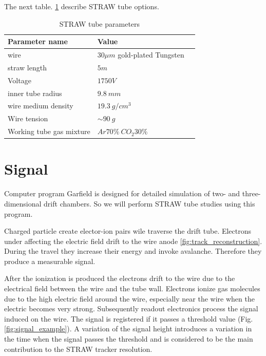 \documentclass[]{article}
\begin{document}
		The next table. \ref{table:straw_par} describe STRAW tube options.
		

	\begin{table}[h]
	\centering
	\begin{tabular}{|l|l|p{8cm}|}
		\hline
		Parameter name & Value \\
		\hline
		wire & $30\mu m$ gold-plated Tungsten\\
		\hline
		straw length & $5m$ \\
		\hline
		Voltage & $1750 V$ \\
		\hline
		inner tube radius & $9.8~mm$ \\
		\hline
		wire medium density & $19.3 ~g/cm^3$ \\
		\hline
		Wire tension& $\sim 90~g$ \\
		\hline
		Working tube gas mixture & $Ar70\% ~CO_2 30\%$ \\
		\hline
	\end{tabular}
	\caption[Table caption text]{STRAW tube parameters }
	\label{table:straw_par}
	\end{table}		
	
	\section{Signal}	
	Computer program Garfield \cite{garfield} is designed for detailed simulation of two- and three-dimensional drift chambers. So we will perform STRAW tube studies using this program.
	
	Charged particle  create elector-ion pairs wile traverse the drift tube. Electrons under affecting the electric field drift to the wire anode \ref{fig:track_reconstruction}. During the travel they increase their energy and invoke avalanche. Therefore they produce a measurable signal.
	
	  After the ionization is produced the electrons drift to the wire due to the electrical field between the wire and the tube wall. Electrons ionize gas molecules due to the high electric field around the wire, especially near the wire when the electric becomes very strong.  Subsequently readout electronics process the signal induced on the wire.
	  The signal is registered if it passes a threshold value (Fig. \ref{fig:signal_example}). A variation of the signal height introduces a variation in the time when the signal passes the threshold and is considered to be the main contribution to the STRAW tracker resolution.
	
\end{document}
